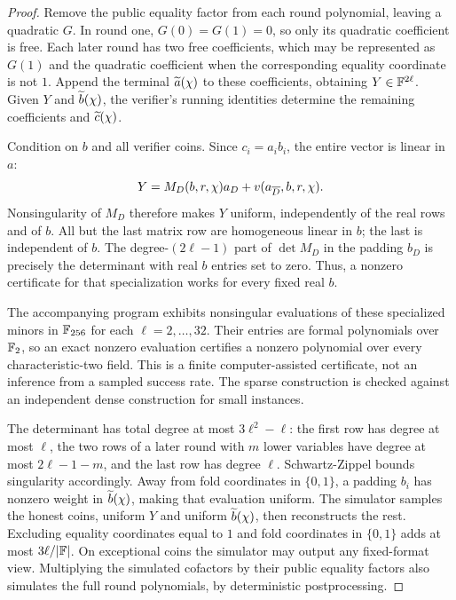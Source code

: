 \begin{proof}
Remove the public equality factor from each round polynomial, leaving a quadratic $G$. In round one, $G(0)=G(1)=0$, so only its quadratic coefficient is free. Each later round has two free coefficients, which may be represented as $G(1)$ and the quadratic coefficient when the corresponding equality coordinate is not $1$. Append the terminal $\widetilde{a}(\chi)$ to these coefficients, obtaining $Y\in\mathbb{F}^{2\ell}$. Given $Y$ and $\widetilde{b}(\chi)$, the verifier's running identities determine the remaining coefficients and $\widetilde{c}(\chi)$.

Condition on $b$ and all verifier coins. Since $c_i=a_ib_i$, the entire vector is linear in $a$:
\[
 Y=M_D(b,r,\chi)a_D+v(a_{\overline D},b,r,\chi).
\]
Nonsingularity of $M_D$ therefore makes $Y$ uniform, independently of the real rows and of $b$. All but the last matrix row are homogeneous linear in $b$; the last is independent of $b$. The degree-$(2\ell-1)$ part of $\det M_D$ in the padding $b_D$ is precisely the determinant with real $b$ entries set to zero. Thus, a nonzero certificate for that specialization works for every fixed real $b$.

The accompanying program exhibits nonsingular evaluations of these specialized minors in $\mathbb{F}_{256}$ for each $\ell=2,\ldots,32$. Their entries are formal polynomials over $\mathbb{F}_2$, so an exact nonzero evaluation certifies a nonzero polynomial over every characteristic-two field. This is a finite computer-assisted certificate, not an inference from a sampled success rate. The sparse construction is checked against an independent dense construction for small instances.

The determinant has total degree at most $3\ell^2-\ell$: the first row has degree at most $\ell$, the two rows of a later round with $m$ lower variables have degree at most $2\ell-1-m$, and the last row has degree $\ell$. Schwartz-Zippel bounds singularity accordingly. Away from fold coordinates in $\{0,1\}$, a padding $b_i$ has nonzero weight in $\widetilde{b}(\chi)$, making that evaluation uniform. The simulator samples the honest coins, uniform $Y$ and uniform $\widetilde{b}(\chi)$, then reconstructs the rest. Excluding equality coordinates equal to $1$ and fold coordinates in $\{0,1\}$ adds at most $3\ell/|\mathbb{F}|$. On exceptional coins the simulator may output any fixed-format view. Multiplying the simulated cofactors by their public equality factors also simulates the full round polynomials, by deterministic postprocessing.
\end{proof}

